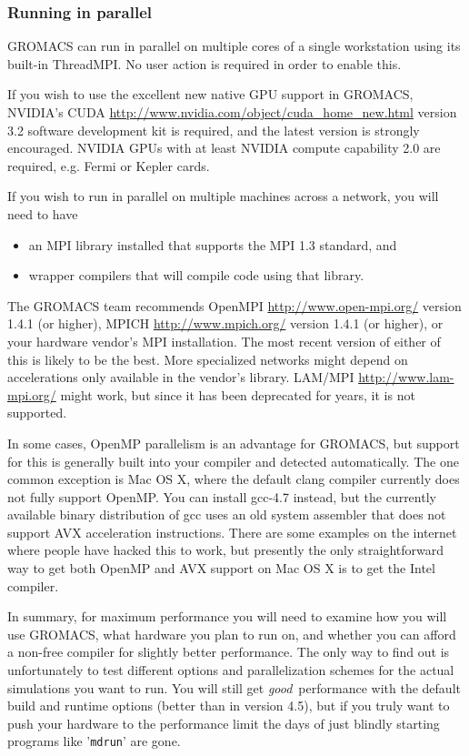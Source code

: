 \documentclass{article}[12pt,a4paper,twoside]
\newcommand{\gromacs}{GROMACS}
\newcommand{\nvidia}{NVIDIA}
\newcommand{\cuda}{CUDA}
\newcommand{\mpi}{MPI}
\newcommand{\threadmpi}{ThreadMPI}
\newcommand{\openmpi}{OpenMPI}
\newcommand{\openmp}{OpenMP}
\newcommand{\lammpi}{LAM/MPI}
\newcommand{\mpich}{MPICH}
\newcommand{\cudaversion}{3.2}
\begin{document}
\subsubsection{Running in parallel}

\gromacs{} can run in parallel on multiple cores of a single
workstation using its built-in \threadmpi. No user action is required
in order to enable this.

If you wish to use the excellent new native GPU support in \gromacs,
\nvidia{}'s \cuda{}
\url{http://www.nvidia.com/object/cuda_home_new.html} version
\cudaversion{} software development kit is required, and the latest
version is strongly encouraged. \nvidia{} GPUs with at least \nvidia{} compute
capability 2.0 are required, e.g. Fermi or Kepler cards.

If you wish to run in parallel on multiple machines across a network,
you will need to have
\begin{itemize}
\item an \mpi{} library installed that supports the \mpi{} 1.3
  standard, and
\item wrapper compilers that will compile code using that library.
\end{itemize}
The \gromacs{} team recommends \openmpi{}
\url{http://www.open-mpi.org/} version 1.4.1 (or higher), \mpich{}
\url{http://www.mpich.org/} version 1.4.1 (or higher), or your
hardware vendor's \mpi{} installation. The most recent version of
either of this is likely to be the best. More specialized networks
might depend on accelerations only available in the vendor's library.
 \lammpi{}
\url{http://www.lam-mpi.org/} might work, but since it has been
deprecated for years, it is not supported.

In some cases, \openmp{} parallelism is an advantage for \gromacs{},
but support for this is generally built into your compiler and detected
automatically. The one common exception is Mac OS X, where the default
clang compiler currently does not fully support OpenMP. You can install
gcc-4.7 instead, but the currently available binary distribution of gcc 
uses an old system assembler that does not support AVX acceleration
instructions. There are some examples on the internet where people have
hacked this to work, but presently the only straightforward way to get
both OpenMP and AVX support on Mac OS X is to get the Intel compiler.

In summary, for maximum performance you will need to 
examine how you will use \gromacs{}, what hardware you plan to run
on, and whether you can afford a non-free compiler for slightly better
performance. The only way to find out is unfortunately to test different
options and parallelization schemes for the actual simulations you
want to run. You will still get {\em good}\, performance with the default
build and runtime options (better than in version 4.5), but if you truly
want to push your hardware to the performance limit the days of just blindly 
starting programs like '\verb+mdrun+' are gone. 
\end{document}
